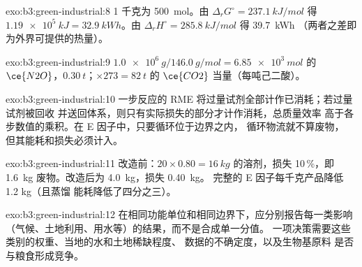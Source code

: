 \begin{solution}{exo:b3:green-industrial:8}
1 千克为 \qty{500}{mol}。由 $\Delta_rG^\circ = \qty{237.1}{kJ/mol}$ 得 $\qty{1.19e5}{kJ} = \qty{32.9}{kWh}$。由 $\Delta_rH^\circ = \qty{285.8}{kJ/mol}$ 得 \qty{39.7}{kWh}
（两者之差即为外界可提供的热量）。
\end{solution}

\begin{solution}{exo:b3:green-industrial:9}
$\qty{1.0e6}{g}/\qty{146.0}{g/mol} = \qty{6.85e3}{mol}$ 的 $\ce{N2O}$，$\qty{0.30}{t}$；$\times 273 = \qty{82}{t}$ 的 $\ce{CO2}$ 当量（每吨己二酸）。
\end{solution}

\begin{solution}{exo:b3:green-industrial:10}
一步反应的 RME 将过量试剂全部计作已消耗；若过量试剂被回收
并送回体系，则只有实际损失的部分才计作消耗，总质量效率
高于各步数值的乘积。在 E 因子中，只要循环位于边界之内，
循环物流就不算废物，
但其能耗和损失必须计入。
\end{solution}

\begin{solution}{exo:b3:green-industrial:11}
改造前：$20 \times 0.80 = \qty{16}{kg}$ 的溶剂，损失 10\,\%，即 \qty{1.6}{kg} 废物。改造后为 \qty{4.0}{kg}，损失 \qty{0.40}{kg}。
完整的 E 因子每千克产品降低 1.2 kg（且蒸馏
能耗降低了四分之三）。
\end{solution}

\begin{solution}{exo:b3:green-industrial:12}
在相同功能单位和相同边界下，应分别报告每一类影响
（气候、土地利用、用水等）的结果，而不是合成单一分值。
一项决策需要这些类别的权重、当地的水和土地稀缺程度、
数据的不确定度，以及生物基原料
是否与粮食形成竞争。
\end{solution}

